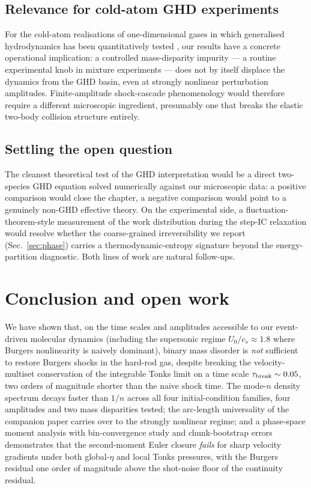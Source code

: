 \documentclass[aps,pre,twocolumn,superscriptaddress,longbibliography,floatfix]{revtex4-2}
\begin{document}
\subsection{Relevance for cold-atom GHD experiments}

For the cold-atom realisations of one-dimensional gases in
which generalised hydrodynamics has been quantitatively tested
\cite{Schemmer2019,Malvania2021,Cataldini2022}, our results have
a concrete operational implication: a controlled mass-disparity
impurity --- a routine experimental knob in mixture experiments
--- does not by itself displace the dynamics from the GHD
basin, even at strongly nonlinear perturbation amplitudes.
Finite-amplitude shock-cascade phenomenology would therefore
require a different microscopic ingredient, presumably one that
breaks the elastic two-body collision structure entirely.

\subsection{Settling the open question}

The cleanest theoretical test of the GHD interpretation would
be a direct two-species GHD equation solved numerically against
our microscopic data: a positive comparison would close the
chapter, a negative comparison would point to a genuinely
non-GHD effective theory. On the experimental side, a
fluctuation-theorem-style measurement of the work
distribution during the step-IC relaxation would resolve
whether the coarse-grained irreversibility we report
(Sec.~\ref{sec:phase}) carries a thermodynamic-entropy
signature beyond the energy-partition diagnostic. Both lines
of work are natural follow-ups.

\section{Conclusion and open work}\label{sec:conclusion}

We have shown that, on the time scales and amplitudes accessible
to our event-driven molecular dynamics (including the
supersonic regime $U_0/c_s \approx 1.8$ where Burgers
nonlinearity is naively dominant), binary mass disorder is
\emph{not} sufficient to restore Burgers shocks in the
hard-rod gas, despite breaking the velocity-multiset
conservation of the integrable Tonks limit on a time scale
$\tau_{\rm break}\sim 0.05$, two orders of magnitude shorter
than the naive shock time. The mode-$n$ density spectrum
decays faster than $1/n$ across all four initial-condition
families, four amplitudes and two mass disparities tested; the
arc-length universality of the companion paper carries over to
the strongly nonlinear regime; and a phase-space moment
analysis with bin-convergence study and chunk-bootstrap errors
demonstrates that the second-moment Euler closure
\emph{fails} for sharp velocity gradients under both
global-$\eta$ and local Tonks pressures, with the Burgers
residual one order of magnitude above the shot-noise floor of
the continuity residual.
\end{document}

